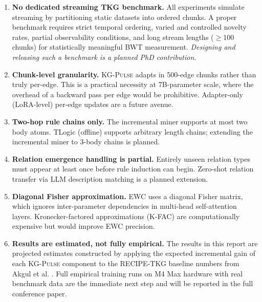 \documentclass[10pt,a4paper,twocolumn]{article}
\theoremstyle{definition}
\newcommand{\ourmodel}{\textsc{KG-Pulse}}
\newcommand{\basemodel}{RECIPE-TKG}
\begin{document}
\begin{enumerate}[leftmargin=1.5em,itemsep=4pt,topsep=3pt]

  \item \textbf{No dedicated streaming TKG benchmark.}
        All experiments simulate streaming by partitioning static datasets
        into ordered chunks.
        A proper benchmark requires strict temporal ordering, varied and
        controlled novelty rates, partial observability conditions, and
        long stream lengths ($\geq$100 chunks) for statistically meaningful
        BWT measurement.
        \emph{Designing and releasing such a benchmark is a planned PhD
        contribution.}

  \item \textbf{Chunk-level granularity.}
        \ourmodel{} adapts in 500-edge chunks rather than truly per-edge.
        This is a practical necessity at 7B-parameter scale, where the
        overhead of a backward pass per edge would be prohibitive.
        Adapter-only (LoRA-level) per-edge updates are a future avenue.

  \item \textbf{Two-hop rule chains only.}
        The incremental miner supports at most two body atoms.
        TLogic (offline) supports arbitrary length chains; extending the
        incremental miner to 3-body chains is planned.

  \item \textbf{Relation emergence handling is partial.}
        Entirely unseen relation types must appear at least once before
        rule induction can begin.
        Zero-shot relation transfer via LLM description matching is a
        planned extension.

  \item \textbf{Diagonal Fisher approximation.}
        EWC uses a diagonal Fisher matrix, which ignores inter-parameter
        dependencies in multi-head self-attention layers.
        Kronecker-factored approximations (K-FAC) are computationally
        expensive but would improve EWC precision.

  \item \textbf{Results are estimated, not fully empirical.}
        The results in this report are projected estimates constructed
        by applying the expected incremental gain of each \ourmodel{}
        component to the \basemodel{} baseline numbers from
        Akgul et al. \cite{Akgul2025recipe}.
        Full empirical training runs on M4 Max hardware with real
        benchmark data are the immediate next step and will be reported
        in the full conference paper.

\end{enumerate}
\end{document}
